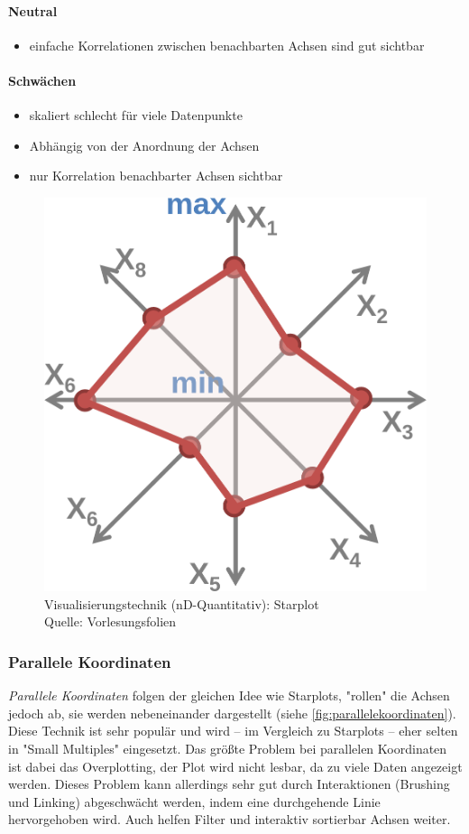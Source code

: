 				\paragraph{Neutral}
				\begin{itemize}
					\item einfache Korrelationen zwischen benachbarten Achsen sind gut sichtbar
				\end{itemize}

				\paragraph{Schwächen}
				\begin{itemize}
					\item skaliert schlecht für viele Datenpunkte
					\item Abhängig von der Anordnung der Achsen
					\item nur Korrelation benachbarter Achsen sichtbar
				\end{itemize}

				\begin{figure}
					\centering
					\includegraphics[width=0.35\linewidth]{starplot}
					\caption[Visualisierungstechnik (nD-Quantitativ): Starplot]{Visualisierungstechnik (nD-Quantitativ): Starplot\\Quelle: Vorlesungsfolien}
					\label{fig:starplot}
				\end{figure}

			\subsubsection{Parallele Koordinaten}
				\emph{Parallele Koordinaten} folgen der gleichen Idee wie Starplots, "rollen" die Achsen jedoch ab, \dh sie werden nebeneinander dargestellt (siehe \autoref{fig:parallelekoordinaten}). Diese Technik ist sehr populär und wird -- im Vergleich zu Starplots -- eher selten in "Small Multiples" eingesetzt. Das größte Problem bei parallelen Koordinaten ist dabei das Overplotting, \dh der Plot wird nicht lesbar, da zu viele Daten angezeigt werden. Dieses Problem kann allerdings sehr gut durch Interaktionen (\zB Brushing und Linking) abgeschwächt werden, indem \bspw eine durchgehende Linie hervorgehoben wird. Auch helfen Filter und interaktiv sortierbar Achsen weiter.

